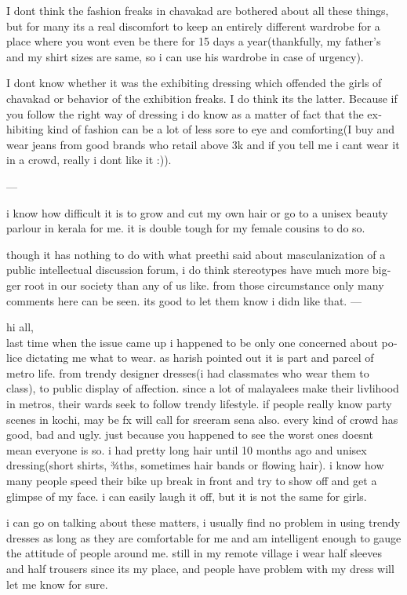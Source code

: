 \begin{english}
I dont think the fashion freaks in chavakad are bothered about all
these things, but for many its a real discomfort to keep an entirely
different wardrobe for a place where you wont even be there for 15
days a year(thankfully, my father's and my shirt sizes are same, so i
can use his wardrobe in case of urgency).

I dont know whether it was the exhibiting dressing which offended the
girls of chavakad or behavior of the exhibition freaks. I do think its
the latter. Because if you follow the right way of dressing i do know
as a matter of fact that the exhibiting kind of fashion can be a lot
of less sore to eye and comforting(I buy and wear jeans from good
brands who retail above 3k and if you tell me i cant wear it in a
crowd, really i dont like it :)).

---

i know how difficult it is to grow and cut my own hair or go to a
unisex beauty parlour in kerala for me. it is double tough for my
female cousins to do so.

though it has nothing to do with what preethi said about
masculanization of a public intellectual discussion forum, i do think
stereotypes have much more bigger root in our society than any of us
like. from those circumstance only many comments here can be seen. its
good to let them know i didn like that.
---

hi all,\\
last time when the issue came up i happened to be only one concerned
about police dictating me what to wear. as harish pointed out it is
part and parcel of metro life. from trendy designer dresses(i had
classmates who wear them to class), to public display of affection.
since a lot of malayalees make their livlihood in metros, their wards
seek to follow trendy lifestyle. if people really know party scenes in
kochi, may be fx will call for sreeram sena also. every kind of crowd
has good, bad and ugly. just because you happened to see the worst
ones doesnt mean everyone is so.
i had pretty long hair until 10 months ago and unisex dressing(short
shirts, ¾ths, sometimes hair bands or flowing hair). i know how many
people speed their bike up break in front and try to show off and get
a glimpse of my face. i can easily laugh it off, but it is not the
same for girls.

i can go on talking about these matters, i usually find no problem in
using trendy dresses as long as they are comfortable for me and am
intelligent enough to gauge the attitude of people around me. still in
my remote village i wear half sleeves and half trousers since its my
place, and people have problem with my dress will let me know for
sure.


\end{english}
